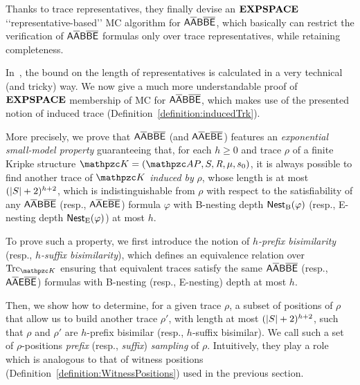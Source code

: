 Thanks to trace representatives,
they finally devise an $\textbf{EXPSPACE}$
\lq\lq representa\-tive-based\rq\rq{} MC algorithm for $\mathsf{A\overline{A}B\overline{B}\overline{E}}$, which basically can restrict the verification of $\mathsf{A\overline{A}B\overline{B}\overline{E}}$ formulas only over trace representatives, while retaining completeness.


In~\cite{MMP15}, the bound on the length of representatives is calculated in a very technical (and tricky) way.
We now give a much more understandable proof of  $\textbf{EXPSPACE}$ membership of MC for $\mathsf{A\overline{A}B\overline{B}\overline{E}}$, which makes use of the presented notion of induced trace (Definition~\ref{definition:inducedTrk}).%

More precisely,
we prove that  $\mathsf{A\overline{A}B\overline{B}\overline{E}}$ (and $\mathsf{A\overline{A}E\overline{B}\overline{E}}$) features an \emph{exponential small-model property} guaranteeing that, for each $h\geq 0$ and trace $\rho$ of a finite Kripke structure $\Ku= \KuDef$,
it is always possible to find another trace of $\Ku$ \emph{induced by} $\rho$, whose length is at most $(|S|+2)^{h+2}$,
 which is indistinguishable from $\rho$ with respect to the satisfiability of any $\mathsf{A\overline{A}B\overline{B}\overline{E}}$ (resp., $\mathsf{A\overline{A}E\overline{B}\overline{E}}$) formula $\varphi$ with B-nesting depth $\operatorname{\mathsf{Nest}_B}(\varphi)$ (resp.,  E-nesting depth  $\operatorname{\mathsf{Nest}_E}(\varphi)$) at most $h$.

To prove such a property, we first introduce %
the notion of \emph{$h$-prefix bisimilarity} (resp., \emph{$h$-suffix bisimilarity}), 
which defines an equivalence relation over $\Trk_{\Ku}$    
ensuring that equivalent traces  satisfy the same   $\mathsf{A\overline{A}B\overline{B}\overline{E}}$ (resp., $\mathsf{A\overline{A}E\overline{B}\overline{E}}$) formulas with 
 B-nesting (resp., E-nesting) depth at most $h$.  

Then, 
we  show how to determine, for a given  trace $\rho$, a subset of positions of $\rho$  that allow us to build another trace $\rho'$, with length at most $(|S|+2)^{h+2}$, such that $\rho$ and $\rho'$ are $h$-prefix bisimilar (resp., $h$-suffix bisimilar). We call such a set of $\rho$-positions \emph{prefix} (resp., \emph{suffix}) \emph{sampling} of $\rho$. Intuitively, they play a role which is analogous to that of witness positions (Definition~\ref{definition:WitnessPositions}) used in  the previous section.

